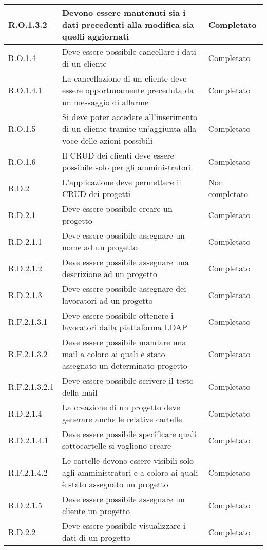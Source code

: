 \begin{longtable}{p{} p{} p{}}
\hline
R.O.1.3.2  & Devono essere mantenuti sia i dati precedenti alla modifica sia quelli aggiornati & Completato \\
\hline
R.O.1.4  & Deve essere possibile cancellare i dati di un cliente & Completato \\
\hline
R.O.1.4.1  & La cancellazione di un cliente deve essere opportunamente preceduta da un messaggio di allarme & Completato \\
\hline
R.O.1.5  & Si deve poter accedere all'inserimento di un cliente tramite un'aggiunta alla voce delle azioni possibili & Completato \\
\hline
R.O.1.6    & Il CRUD dei clienti deve essere possibile solo per gli amministratori & Completato \\
\hline
R.D.2    & L'applicazione deve permettere il CRUD dei progetti & Non completato \\
\hline
R.D.2.1    & Deve essere possibile creare un progetto & Completato \\
\hline
R.D.2.1.1    & Deve essere possibile assegnare un nome ad un progetto & Completato \\
\hline
R.D.2.1.2    & Deve essere possibile assegnare una descrizione ad un progetto & Completato \\
\hline
R.D.2.1.3    & Deve essere possibile assegnare dei lavoratori ad un progetto & Completato \\
\hline
R.F.2.1.3.1    & Deve essere possibile ottenere i lavoratori dalla piattaforma LDAP & Completato \\
\hline
R.F.2.1.3.2   & Deve essere possibile mandare una mail a coloro ai quali è stato assegnato un determinato progetto & Completato \\
\hline
R.F.2.1.3.2.1   & Deve essere possibile scrivere il testo della mail & Completato \\
\hline
R.D.2.1.4  & La creazione di un progetto deve generare anche le relative cartelle & Completato \\
\hline
R.D.2.1.4.1  & Deve essere possibile specificare quali sottocartelle si vogliono creare & Completato \\
\hline
R.F.2.1.4.2  & Le cartelle devono essere visibili solo agli amministratori e a coloro ai quali è stato assegnato un progetto & Completato \\
\hline
R.D.2.1.5  & Deve essere possibile assegnare un cliente un progetto & Completato \\
\hline
R.D.2.2    & Deve essere possibile visualizzare i dati di un progetto &Completato \\

\end{longtable}
